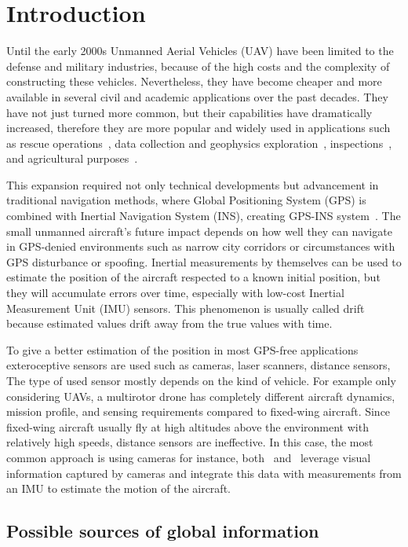 \chapter{Introduction}

Until the early 2000s Unmanned Aerial Vehicles (UAV) have been limited to the defense and military industries, because of the high costs and the complexity of constructing these vehicles. Nevertheless, they have become cheaper and more available in several civil and academic applications over the past decades. They have not just turned more common, but their capabilities have dramatically increased, therefore they are more popular and widely used in applications such as rescue operations~\cite{rescue-operations}, data collection and geophysics exploration~\cite{data-collection}, inspections~\cite{inspection}, and agricultural purposes~\cite{agriculure}.

This expansion required not only technical developments but advancement in traditional navigation methods, where Global Positioning System (GPS) is combined with Inertial Navigation System (INS), creating GPS-INS system~\cite{gps-ins}. The small unmanned aircraft's future impact depends on how well they can navigate in GPS-denied environments such as narrow city corridors or circumstances with GPS disturbance or spoofing.  Inertial measurements by themselves can be used to estimate the position of the aircraft respected to a known initial position, but they will accumulate errors over time, especially with low-cost Inertial Measurement Unit (IMU) sensors. This phenomenon is usually called drift because estimated values drift away from the true values with time.

To give a better estimation of the position in most GPS-free applications exteroceptive sensors are used such as cameras, laser scanners, distance sensors, \etc{} The type of used sensor mostly depends on the kind of vehicle. For example only considering UAVs, a multirotor drone has completely different aircraft dynamics, mission profile, and sensing requirements compared to fixed-wing aircraft. Since fixed-wing aircraft usually fly at high altitudes above the environment with relatively high speeds, distance sensors are ineffective. In this case, the most common approach is using cameras for instance, both~\cite{gps-ins-cam} and~\cite{rel-nav} leverage visual information captured by cameras and integrate this data with measurements from an IMU to estimate the motion of the aircraft. 

\section{Possible sources of global information}

